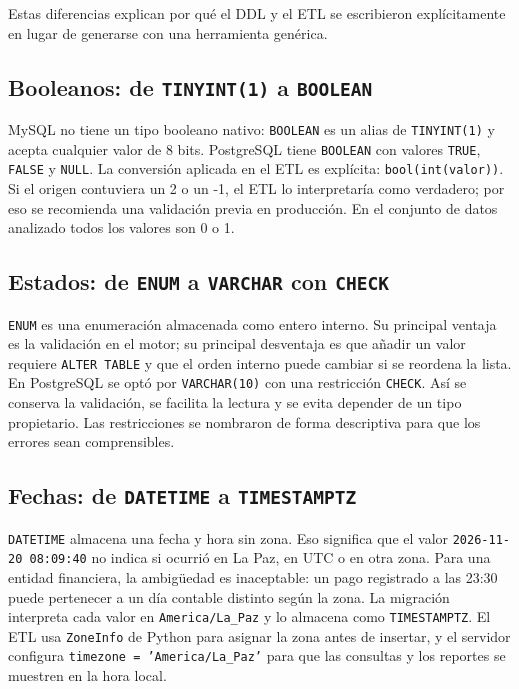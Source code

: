 Estas diferencias explican por qué el DDL y el ETL se escribieron
explícitamente en lugar de generarse con una herramienta genérica.

\subsection{Booleanos: de \texttt{TINYINT(1)} a \texttt{BOOLEAN}}

MySQL no tiene un tipo booleano nativo: \texttt{BOOLEAN} es un alias de
\texttt{TINYINT(1)} y acepta cualquier valor de 8 bits. PostgreSQL tiene
\texttt{BOOLEAN} con valores \texttt{TRUE}, \texttt{FALSE} y \texttt{NULL}.
La conversión aplicada en el ETL es explícita: \texttt{bool(int(valor))}. Si
el origen contuviera un 2 o un -1, el ETL lo interpretaría como verdadero; por
eso se recomienda una validación previa en producción. En el conjunto de
datos analizado todos los valores son 0 o 1.

\subsection{Estados: de \texttt{ENUM} a \texttt{VARCHAR} con \texttt{CHECK}}

\texttt{ENUM} es una enumeración almacenada como entero interno. Su principal
ventaja es la validación en el motor; su principal desventaja es que añadir un
valor requiere \texttt{ALTER TABLE} y que el orden interno puede cambiar si se
reordena la lista. En PostgreSQL se optó por \texttt{VARCHAR(10)} con una
restricción \texttt{CHECK}. Así se conserva la validación, se facilita la
lectura y se evita depender de un tipo propietario. Las restricciones se
nombraron de forma descriptiva para que los errores sean comprensibles.

\subsection{Fechas: de \texttt{DATETIME} a \texttt{TIMESTAMPTZ}}

\texttt{DATETIME} almacena una fecha y hora sin zona. Eso significa que el
valor \texttt{2026-11-20 08:09:40} no indica si ocurrió en La Paz, en UTC o en
otra zona. Para una entidad financiera, la ambigüedad es inaceptable: un pago
registrado a las 23:30 puede pertenecer a un día contable distinto según la
zona. La migración interpreta cada valor en \texttt{America/La\_Paz} y lo
almacena como \texttt{TIMESTAMPTZ}. El ETL usa \texttt{ZoneInfo} de Python
para asignar la zona antes de insertar, y el servidor configura
\texttt{timezone = 'America/La\_Paz'} para que las consultas y los reportes
se muestren en la hora local.

